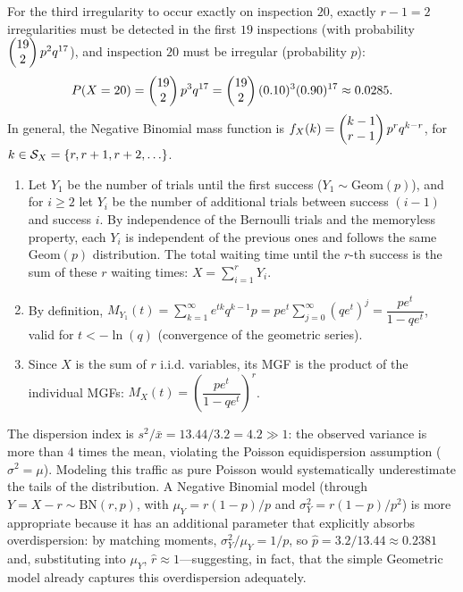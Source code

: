 \begin{solproblema}
	For the third irregularity to occur exactly on inspection $20$, exactly $r-1=2$ irregularities must be detected in the first $19$ inspections (with probability $\begin{pmatrix} 19 \\ 2\end{pmatrix}p^2q^{17}$), and inspection $20$ must be irregular (probability $p$):
	\begin{align*}
		P(X=20) = \begin{pmatrix} 19 \\ 2\end{pmatrix}p^3q^{17} = \begin{pmatrix} 19 \\ 2\end{pmatrix}(0.10)^3(0.90)^{17} \approx 0.0285.
	\end{align*}
	In general, the Negative Binomial mass function is $f_X(k) = \begin{pmatrix} k-1 \\ r-1\end{pmatrix}p^r q^{k-r}$, for $k \in \mathcal{S}_X = \set{r, r+1, r+2, \dots}$.
\end{solproblema}

\begin{solproblema}[prob:a4a72f3]
	\begin{enumerate}
		\item Let $Y_1$ be the number of trials until the first success ($Y_1\sim\text{Geom}(p)$), and for $i\ge2$ let $Y_i$ be the number of additional trials between success $(i-1)$ and success $i$. By independence of the Bernoulli trials and the memoryless property, each $Y_i$ is independent of the previous ones and follows the same $\text{Geom}(p)$ distribution. The total waiting time until the $r$-th success is the sum of these $r$ waiting times: $X = \sum_{i=1}^r Y_i$.
		\item By definition, $M_{Y_1}(t) = \sum_{k=1}^\infty e^{tk}q^{k-1}p = pe^t\sum_{j=0}^\infty (qe^t)^j = \dfrac{pe^t}{1-qe^t}$, valid for $t < -\ln(q)$ (convergence of the geometric series).
		\item Since $X$ is the sum of $r$ i.i.d. variables, its MGF is the product of the individual MGFs: $M_X(t) = \left(\dfrac{pe^t}{1-qe^t}\right)^r$.
	\end{enumerate}
\end{solproblema}

\begin{solproblema}[prob:ca5c4c8]
	The dispersion index is $s^2/\bar{x} = 13.44/3.2 = 4.2 \gg 1$: the observed variance is more than $4$ times the mean, violating the Poisson equidispersion assumption ($\sigma^2=\mu$). Modeling this traffic as pure Poisson would systematically underestimate the tails of the distribution. A Negative Binomial model (through $Y=X-r\sim\text{BN}(r,p)$, with $\mu_Y=r(1-p)/p$ and $\sigma_Y^2=r(1-p)/p^2$) is more appropriate because it has an additional parameter that explicitly absorbs overdispersion: by matching moments, $\sigma_Y^2/\mu_Y = 1/p$, so $\hat p = 3.2/13.44 \approx 0.2381$ and, substituting into $\mu_Y$, $\hat r \approx 1$---suggesting, in fact, that the simple Geometric model already captures this overdispersion adequately.
\end{solproblema}

